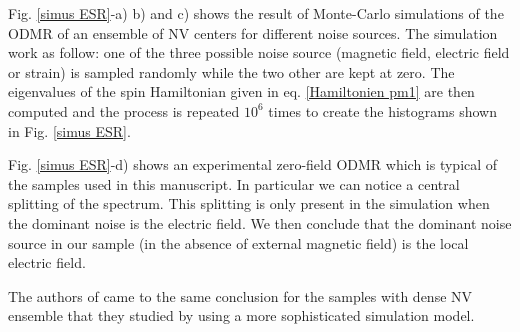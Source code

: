\documentclass[a4paper, 11pt]{book}
\begin{document}
%

Fig. \ref{simus ESR}-a) b) and c) shows the result of Monte-Carlo simulations of the ODMR of an ensemble of NV centers for different noise sources. The simulation work as follow: one of the three possible noise source (magnetic field, electric field or strain) is sampled randomly while the two other are kept at zero. The eigenvalues of the spin Hamiltonian given in eq. \ref{Hamiltonien pm1} are then computed and the process is repeated $10^6$ times to create the histograms shown in Fig. \ref{simus ESR}.

Fig. \ref{simus ESR}-d) shows an experimental zero-field ODMR which is typical of the samples used in this manuscript. In particular we can notice a central splitting of the spectrum. This splitting is only present in the simulation when the dominant noise is the electric field. We then conclude that the dominant noise source in our sample (in the absence of external magnetic field) is the local electric field.

The authors of \citep{mittiga2018imaging} came to the same conclusion for the samples with dense NV ensemble that they studied by using a more sophisticated simulation model.

\end{document}
